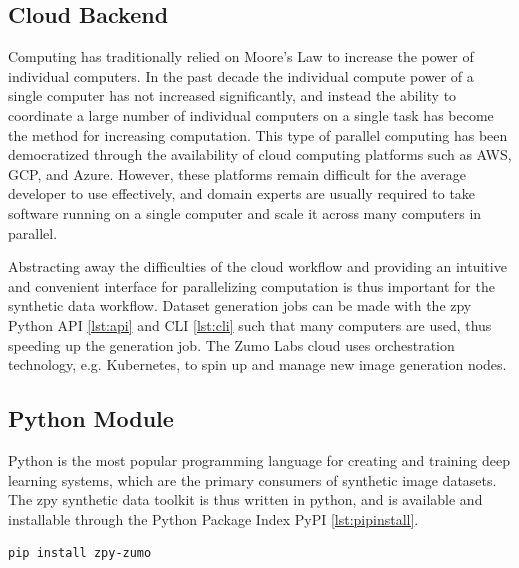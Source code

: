 \documentclass{article}
\begin{document}
\subsection{Cloud Backend}
\label{sec:cloudbackend}

Computing has traditionally relied on Moore’s Law to increase the power of individual computers. In the past decade the individual compute power of a single computer has not increased significantly, and instead the ability to coordinate a large number of individual computers on a single task has become the method for increasing computation. This type of parallel computing has been democratized through the availability of cloud computing platforms such as AWS, GCP, and Azure. However, these platforms remain difficult for the average developer to use effectively, and domain experts are usually required to take software running on a single computer and scale it across many computers in parallel.

Abstracting away the difficulties of the cloud workflow and providing an intuitive and convenient interface for parallelizing computation is thus important for the synthetic data workflow. Dataset generation jobs can be made with the zpy Python API \ref{lst:api} and CLI \ref{lst:cli} such that many computers are used, thus speeding up the generation job. The Zumo Labs cloud uses orchestration technology, e.g. Kubernetes, to spin up and manage new image generation nodes.

\subsection{Python Module}
\label{sec:pythonmodule}

Python is the most popular programming language for creating and training deep learning systems, which are the primary consumers of synthetic image datasets. The zpy synthetic data toolkit is thus written in python, and is available and installable through the Python Package Index PyPI \ref{lst:pipinstall}.

\begin{lstlisting}[language=bash,caption={Installing the zpy python module.},label={lst:pipinstall}]
pip install zpy-zumo
\end{lstlisting}
\end{document}
